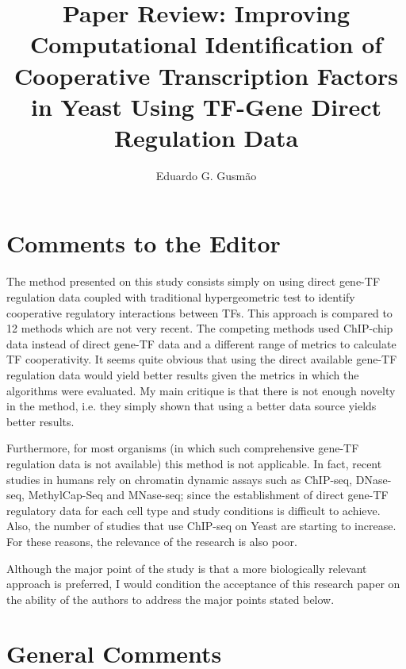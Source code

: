 \documentclass[11pt]{article}
\begin{document}
\title{Paper Review: Improving Computational Identification of Cooperative Transcription Factors in Yeast Using TF-Gene Direct Regulation Data} \date{}

\author{Eduardo G. Gusm\~{a}o}

\thispagestyle{empty}

\maketitle

\setlength{\parskip}{0.5cm}

\section{Comments to the Editor}

The method presented on this study consists simply on using direct gene-TF regulation data coupled with traditional hypergeometric test to identify cooperative regulatory interactions between TFs. This approach is compared to 12 methods which are not very recent. The competing methods used ChIP-chip data instead of direct gene-TF data and a different range of metrics to calculate TF cooperativity. It seems quite obvious that using the direct available gene-TF regulation data would yield better results given the metrics in which the algorithms were evaluated. My main critique is that there is not enough novelty in the method, i.e. they simply shown that using a better data source yields better results.

Furthermore, for most organisms (in which such comprehensive gene-TF regulation data is not available) this method is not applicable. In fact, recent studies in humans rely on chromatin dynamic assays such as ChIP-seq, DNase-seq, MethylCap-Seq and MNase-seq; since the establishment of direct gene-TF regulatory data for each cell type and study conditions is difficult to achieve. Also, the number of studies that use ChIP-seq on Yeast are starting to increase. For these reasons, the relevance of the research is also poor.

Although the major point of the study is that a more biologically relevant approach is preferred, I would condition the acceptance of this research paper on the ability of the authors to address the major points stated below.

\section{General Comments}
\end{document}
